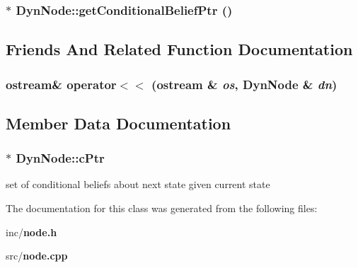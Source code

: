 \subsubsection{$\ast$ DynNode::getConditionalBeliefPtr ()\hspace{0.3cm}{\tt  [inline]}}\label{classDynNode_adf2e00588988f9705de42c4c2930918}




\subsection{Friends And Related Function Documentation}
\subsubsection{\setlength{\rightskip}{0pt plus 5cm}ostream\& operator$<$$<$ (ostream \& {\em os}, {\bf DynNode} \& {\em dn})\hspace{0.3cm}{\tt  [friend]}}\label{classDynNode_ce217a788f52579d20aeabc6ef30650e}




\subsection{Member Data Documentation}
\subsubsection{$\ast$ {\bf DynNode::cPtr}\hspace{0.3cm}{\tt  [private]}}\label{classDynNode_03326c806301531f149a01c9291245a9}


set of conditional beliefs about next state given current state 



The documentation for this class was generated from the following files:\begin{CompactItemize}
\item 
inc/{\bf node.h}\item 
src/{\bf node.cpp}\end{CompactItemize}
